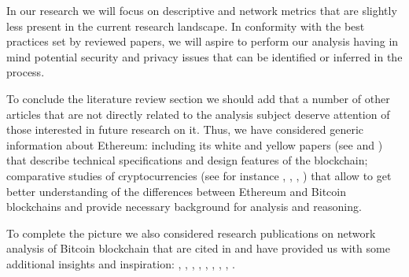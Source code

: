 In our research we will focus on descriptive and network metrics that are slightly less present in the current research landscape.
In conformity with the best practices set by reviewed papers, we will aspire to perform our analysis having in mind potential security and privacy issues that can be identified or inferred in the process.

To conclude the literature review section we should add that a number of other articles that are not directly related to the analysis subject deserve attention of those interested in future research on it. 
Thus, we have considered generic information about Ethereum: 
including its white and yellow papers (see \cite{buterin2014next} and \cite{wood2014Ethereum}) that describe technical specifications and design features of the blockchain; 
comparative studies of cryptocurrencies (see for instance \cite{maesa2018blockchain}, 
\cite{rudlang2017comparative}, 
\cite{sapuric2017distributed}, 
\cite{anderson2016new}) that allow to get better understanding of the differences between Ethereum and Bitcoin blockchains and provide necessary background for analysis and reasoning.

To complete the picture we also considered research publications on network analysis of Bitcoin blockchain that are cited in \cite{lischke2016analyzing} and have provided us with some additional insights and inspiration: 
\cite{reid2013analysis}, 
\cite{baumann2014exploring}, 
\cite{drainville2012analysis}, 
\cite{ober2013structure}, 
\cite{meiklejohn2013fistful}, 
\cite{spagnuolo2014bitiodine}, 
\cite{androulaki2013evaluating}, 
\cite{kaminsky2011black}, 
\cite{ortega2013bitcoin}.






